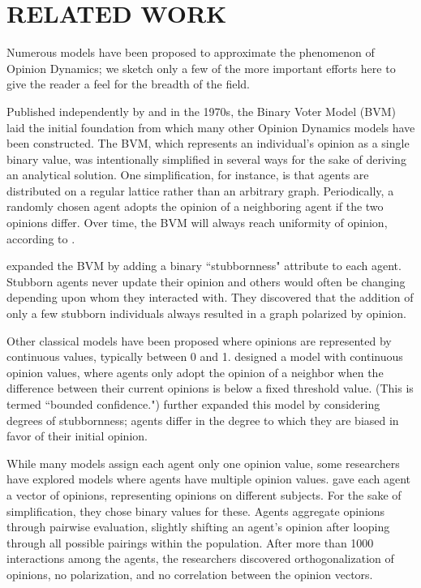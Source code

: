
\section{RELATED WORK}

Numerous models have been proposed to approximate the phenomenon of Opinion
Dynamics; we sketch only a few of the more important efforts here to give the
reader a feel for the breadth of the field.

Published independently by \cite{clifford_model_1973} and
\cite{holley_ergodic_1975} in the 1970s, the Binary Voter
Model (BVM) laid the initial foundation from which many other Opinion Dynamics
models have been constructed. The BVM, which represents an individual's
opinion as a single binary value, was intentionally simplified in several ways
for the sake of deriving an analytical solution. One simplification,
for instance, is that agents are distributed on a regular lattice rather than
an arbitrary graph. Periodically, a randomly chosen agent adopts the opinion
of a neighboring agent if the two opinions differ. Over time, the BVM will
always reach uniformity of opinion, according to
\cite[ch.~14]{aldous-fill-2014}.

\cite{yildiz_discrete_2011} expanded the BVM by adding a binary
``stubbornness" attribute to each agent. Stubborn agents never update their
opinion and 
others would often be changing depending upon whom they interacted with. They
discovered that the addition of only a few stubborn individuals always
resulted in a graph polarized by opinion.

Other classical models have been proposed where opinions are represented by
continuous values, typically between 0 and 1. \cite{weisbuch_interacting_2001}
designed a model with continuous opinion values, where agents only adopt the
opinion of a neighbor when the difference between their current opinions is
below a fixed threshold value. (This is termed ``bounded confidence.")
\cite{ghaderi_opinion_2012} further expanded this model by considering degrees
of stubbornness; agents differ in the degree to which they are biased in favor
of their initial opinion.

While many models assign each agent only one opinion value, some researchers
have explored models where agents have multiple opinion values.
\cite{deffuant_mixing_2000} gave each agent a vector of opinions, representing
opinions on different subjects. For the sake of simplification, they chose
binary values for these. Agents aggregate opinions through pairwise
evaluation, 
slightly shifting an agent's opinion after looping through all possible
pairings within the population. After more than 1000 interactions among the
agents, the researchers discovered orthogonalization of opinions, no
polarization, and no correlation between the opinion vectors.

